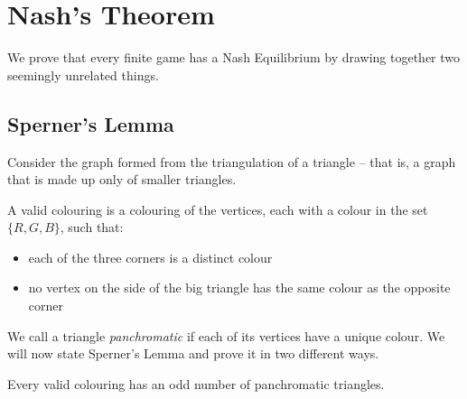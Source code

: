 \section{Nash's Theorem}
	We prove that every finite game has a Nash Equilibrium by drawing together
	two seemingly unrelated things.

	\subsection{Sperner's Lemma}
	Consider the graph formed from the triangulation of a triangle -- that is,
	a graph that is made up only of smaller triangles.

	\begin{definition}
		A valid colouring is a colouring of the vertices, each with a colour in
		the set $\{R,G,B\}$, such that:
		\begin{itemize}
			\item each of the three corners is a distinct colour
			\item no vertex on the side of the big triangle has the same colour
				as the opposite corner
		\end{itemize}
	\end{definition}

	We call a triangle \textit{panchromatic} if each of its vertices have a
	unique colour. We will now state Sperner's Lemma and prove it in two
	different ways.

	\begin{theorem}
		Every valid colouring has an odd number of panchromatic triangles.
	\end{theorem}

